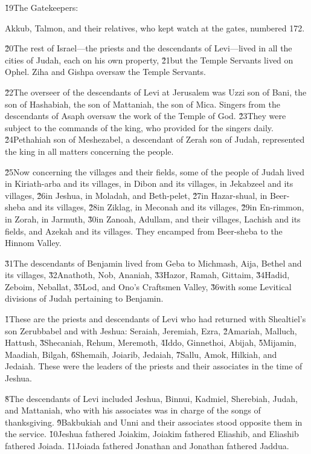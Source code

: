\v{19}The Gatekeepers:

Akkub, Talmon, and their relatives, who kept watch at the gates, numbered 172.

\v{20}The rest of Israel---the priests and the descendants of Levi---lived in all the cities of Judah, each on his own property, \v{21}but the Temple Servants lived on Ophel. Ziha and Gishpa oversaw the Temple Servants.

\v{22}The overseer of the descendants of Levi at Jerusalem was Uzzi son of Bani, the son of Hashabiah, the son of Mattaniah, the son of Mica. Singers from the descendants of Asaph oversaw the work of the Temple of God. \v{23}They were subject to the commands of the king, who provided for the singers daily. \v{24}Pethahiah son of Meshezabel, a descendant of Zerah son of Judah, represented the king in all matters concerning the people.

\v{25}Now concerning the villages and their fields, some of the people of Judah lived in Kiriath-arba and its villages, in Dibon and its villages, in Jekabzeel and its villages, \v{26}in Jeshua, in Moladah, and Beth-pelet, \v{27}in Hazar-shual, in Beer-sheba and its villages, \v{28}in Ziklag, in Meconah and its villages, \v{29}in En-rimmon, in Zorah, in Jarmuth, \v{30}in Zanoah, Adullam, and their villages, Lachish and its fields, and Azekah and its villages. They encamped from Beer-sheba to the Hinnom Valley.

\v{31}The descendants of Benjamin lived from Geba to Michmash, Aija, Bethel and its villages, \v{32}Anathoth, Nob, Ananiah, \v{33}Hazor, Ramah, Gittaim, \v{34}Hadid, Zeboim, Neballat, \v{35}Lod, and Ono's Craftsmen Valley, \v{36}with some Levitical divisions of Judah pertaining to Benjamin.

\v{1}These are the priests and descendants of Levi who had returned with Shealtiel's son Zerubbabel and with Jeshua: Seraiah, Jeremiah, Ezra, \v{2}Amariah, Malluch, Hattush, \v{3}Shecaniah, Rehum, Meremoth, \v{4}Iddo, Ginnethoi, Abijah, \v{5}Mijamin, Maadiah, Bilgah, \v{6}Shemaih, Joiarib, Jedaiah, \v{7}Sallu, Amok, Hilkiah, and Jedaiah. These were the leaders of the priests and their associates in the time of Jeshua.

\v{8}The descendants of Levi included Jeshua, Binnui, Kadmiel, Sherebiah, Judah, and Mattaniah, who with his associates was in charge of the songs of thanksgiving. \v{9}Bakbukiah and Unni and their associates stood opposite them in the service. \v{10}Jeshua fathered Joiakim, Joiakim fathered Eliashib, and Eliashib fathered Joiada. \v{11}Joiada fathered Jonathan and Jonathan fathered Jaddua.

